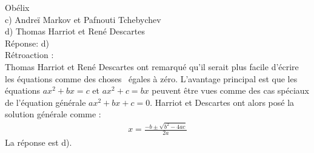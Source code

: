 \documentclass[letterpaper, 12pt]{article}
\begin{document}
Ob\'elix\\
c) Andre\"i Markov et Pafnouti Tchebychev\\
d) Thomas Harriot et Ren\'e Descartes\\

R\'eponse: d)\\

R\'etroaction :\\
Thomas Harriot et Ren\'e Descartes ont remarqu\'e qu'il serait plus facile d'\'ecrire les \'equations comme des \og choses \fg \ \'egales \`a z\'ero. L'avantage principal est que les \'equations $ax^{2} + bx = c$ et $ax^{2} + c = bx$ peuvent \^etre vues comme des cas sp\'eciaux de l'\'equation g\'en\'erale $ax^{2} + bx + c = 0$. Harriot et Descartes ont alors pos\'e la solution g\'en\'erale comme :
\begin{eqnarray*}
x = \frac{-b \pm \sqrt{b^{2} - 4ac}}{2a}
\end{eqnarray*}
La r\'eponse est d).
\end{document}
